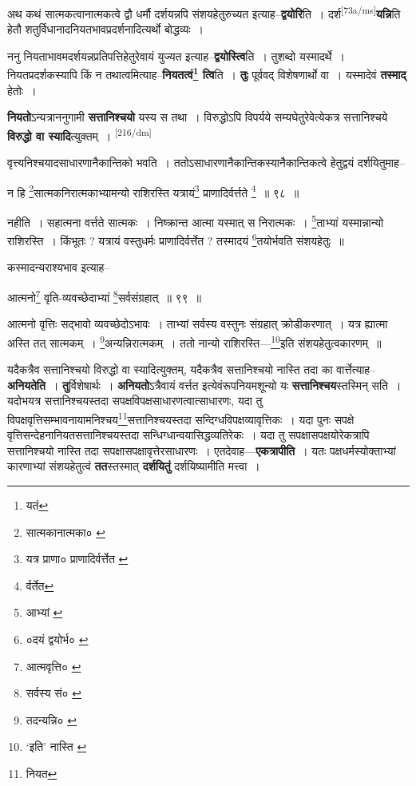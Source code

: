 \documentclass[article,12pt,a4paper]{memoir}
\begin{document}
	  \pstart अथ कथं सात्मकत्वानात्मकत्वे द्वौ धर्मौ दर्शयन्नपि संशयहेतुरुच्यत इत्याह--\textbf{द्वयोरि}ति । दर्श\leavevmode\textsuperscript{\rmlatinfont\tiny [73a/ms]}\textbf{यन्नि}ति हेतौ शतुर्विधानादनियतभावप्रदर्शनादित्यर्थो बोद्धव्यः ।
	\pend
      

	  \pstart ननु नियताभावमदर्शयन्नप्रतिपत्तिहेतुरेवायं युज्यत इत्याह--\textbf{द्वयोस्त्वि}ति । तुशब्दो यस्मादर्थे । नियतप्रदर्शकस्यापि किं न तथात्वमित्याह--\textbf{नियतत्वं\footnote{यतं} त्वि}ति । \textbf{तुः} पूर्ववद् विशेषणार्थो वा । यस्मादेवं \textbf{तस्माद्} हेतोः ।
	\pend
      

	  \pstart \textbf{नियतो}ऽन्यत्राननुगामी \textbf{सत्तानिश्चयो} यस्य स तथा । विरुद्धोऽपि विपर्यये सम्यघेतुरेवेत्येकत्र सत्तानिश्चये \textbf{विरुद्धो वा स्यादि}त्युक्तम् ।
	\pend
      \leavevmode\textsuperscript{\rmlatinfont\tiny [216/dm]}

	  \pstart वृत्त्यनिश्चयादसाधारणानैकान्तिको भवति । ततोऽसाधारणानैकान्तिकस्यानैकान्तिकत्वे हेतुद्वयं दर्शयितुमाह--
	\pend
       

	  \pstart न हि \footnote{सात्मकानात्मका० \cite{dp-msC}}सात्मकनिरात्मकाभ्यामन्यो राशिरस्ति यत्रायं\footnote{यत्र प्राणा० \cite{dp-msD} \cite{dp-msB} \cite{dp-edP} \cite{dp-edH} \cite{dp-edE} \cite{dp-edN} प्राणादिर्वर्त्तेत \cite{dp-edN}} प्राणादिर्वर्त्तते \footnote{र्वर्तेत} ॥ ९८ ॥
	\pend
       

	  \pstart नहीति । सहात्मना वर्त्तते सात्मकः । निष्क्रान्त आत्मा यस्मात् स निरात्मकः । \footnote{आभ्यां \cite{dp-msD}}ताभ्यां यस्मान्नान्यो राशिरस्ति । किंभूतः ? यत्रायं वस्तुधर्मः प्राणादिर्वर्त्तेत ? तस्मादयं \footnote{०दयं द्वयोर्भ० \cite{dp-msC}}तयोर्भवति संशयहेतुः ॥
	\pend
       

	  \pstart कस्मादन्यराश्यभाव इत्याह--
	\pend
       

	  \pstart आत्मनो\footnote{आत्मवृत्ति० \cite{dp-msC}} वृति-व्यवच्छेदाभ्यां \footnote{सर्वस्य सं० \cite{dp-msC}}सर्वसंग्रहात् ॥ ९९ ॥
	\pend
       

	  \pstart आत्मनो वृत्तिः सद्भावो व्यवच्छेदोऽभावः । ताभ्यां सर्वस्य वस्तुनः संग्रहात् क्रोडीकरणात् । यत्र ह्यात्मा अस्ति तत् सात्मकम् । \footnote{तदन्यन्नि० \cite{dp-msA} \cite{dp-msB} \cite{dp-edP} \cite{dp-edH} \cite{dp-edN}}अन्यन्निरात्मकम् । ततो नान्यो राशिरस्ति—\footnote{‘इति’ नास्ति \cite{dp-msA} \cite{dp-msB} \cite{dp-msC} \cite{dp-msD} \cite{dp-edP} \cite{dp-edH} \cite{dp-edN}}इति संशयहेतुत्वकारणम् ॥
	\pend
      

	  \pstart यदैकत्रैव सत्तानिश्चयो विरुद्धो वा स्यादित्युक्तम्, यदैकत्रैव सत्तानिश्चयो नास्ति तदा का वार्त्तेत्याह--\textbf{अनियतेति} । \textbf{तु}र्विशेषार्थः । \textbf{अनियतो}ऽत्रैवायं वर्त्तत इत्येवंरूपनियमशून्यो यः \textbf{सत्तानिश्चय}स्तस्मिन् सति । यदोभयत्र सत्तानिश्चयस्तदा सपक्षविपक्षसाधारणत्वात्साधारणः, यदा तु विपक्षवृत्तिसम्भावनायामनिश्चय\footnote{नियत}सत्तानिश्चयस्तदा सन्दिग्धविपक्षव्यावृत्तिकः । यदा पुनः सपक्षे वृत्तिसन्देहनानियतसत्तानिश्चयस्तदा सन्धिग्धान्वयासिद्धव्यतिरेकः । यदा तु सपक्षासपक्षयोरेकत्रापि सत्तानिश्चयो नास्ति तदा सपक्षासपक्षावृत्तेरसाधारणः । एतदेवाह—\textbf{एकत्रापीति} । यतः पक्षधर्मस्योक्ताभ्यां कारणाभ्यां संशयहेतुत्वं \textbf{तत}स्तस्मात् \textbf{दर्शयितुं} दर्शयिष्यामीति मत्त्वा ।
	\pend
      
\end{document}
